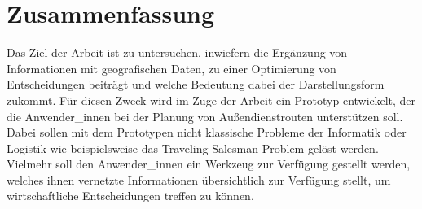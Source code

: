 \documentclass[Bachelorarbeit.tex]{subfiles}
\begin{document}
\chapter*{Zusammenfassung}

Das Ziel der Arbeit ist zu untersuchen, 
inwiefern die Ergänzung  von Informationen mit geografischen Daten, 
zu einer Optimierung von Entscheidungen beiträgt und welche Bedeutung dabei der Darstellungsform zukommt. 
Für diesen Zweck wird im Zuge der Arbeit ein Prototyp entwickelt, der die Anwender\_innen bei der Planung von Außendienstrouten unterstützen soll. 
Dabei sollen mit dem Prototypen nicht klassische Probleme der Informatik oder Logistik wie beispielsweise das Traveling Salesman Problem gelöst werden. Vielmehr soll den Anwender\_innen ein Werkzeug zur Verfügung gestellt werden, welches ihnen vernetzte Informationen übersichtlich zur Verfügung stellt, um wirtschaftliche Entscheidungen treffen zu können.\\
\\
\end{document}
